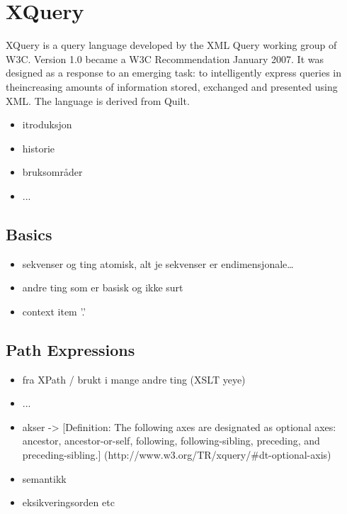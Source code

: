 \section{XQuery}
\label{sect:theory:xquery}

XQuery is a query language developed by the XML Query working group of W3C.
Version 1.0\cite{w3c00} became a W3C Recommendation January 2007. It was designed as a
response to an emerging task: to intelligently express queries in theincreasing
amounts of information stored, exchanged and presented using XML. The language
is derived from Quilt\cite{quilt_queryLanguage}.


\begin{itemize}
\item itroduksjon
\item historie
\item bruksomr\aa der
\item ...
\end{itemize}

\subsection{Basics}
\label{sect:theory:basics}
\begin{itemize}
  \item sekvenser og ting atomisk, alt je sekvenser er endimensjonale\ldots
  \item andre ting som er basisk og ikke surt
  \item context item '.'
\end{itemize}

\subsection{Path Expressions}
\label{sect:theory:xqueryPathExpressions}
\begin{itemize}
\item fra XPath / brukt i mange andre ting (XSLT yeye)
\item ...
\item akser -> [Definition: The following axes are designated as optional axes:
ancestor, ancestor-or-self, following, following-sibling, preceding, and
preceding-sibling.] (http://www.w3.org/TR/xquery/\#dt-optional-axis)
\item semantikk 
\item eksikveringsorden etc
\end{itemize}

